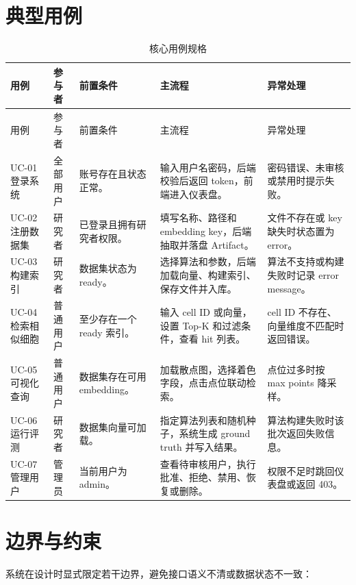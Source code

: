 \documentclass[UTF8,a4paper,12pt]{ctexrep}
\begin{document}
\section{典型用例}

\begin{longtable}{@{}L{0.10\textwidth}L{0.14\textwidth}L{0.20\textwidth}L{0.30\textwidth}L{0.14\textwidth}@{}}
  \caption{核心用例规格} \\
  \toprule
  用例 & 参与者 & 前置条件 & 主流程 & 异常处理 \\
  \midrule
  \endfirsthead
  \toprule
  用例 & 参与者 & 前置条件 & 主流程 & 异常处理 \\
  \midrule
  \endhead
  UC-01 登录系统 & 全部用户 & 账号存在且状态正常。 & 输入用户名密码，后端校验后返回 token，前端进入仪表盘。 & 密码错误、未审核或禁用时提示失败。 \\
  UC-02 注册数据集 & 研究者 & 已登录且拥有研究者权限。 & 填写名称、路径和 embedding key，后端抽取并落盘 Artifact。 & 文件不存在或 key 缺失时状态置为 error。 \\
  UC-03 构建索引 & 研究者 & 数据集状态为 ready。 & 选择算法和参数，后端加载向量、构建索引、保存文件并入库。 & 算法不支持或构建失败时记录 error message。 \\
  UC-04 检索相似细胞 & 普通用户 & 至少存在一个 ready 索引。 & 输入 cell ID 或向量，设置 Top-K 和过滤条件，查看 hit 列表。 & cell ID 不存在、向量维度不匹配时返回错误。 \\
  UC-05 可视化查询 & 普通用户 & 数据集存在可用 embedding。 & 加载散点图，选择着色字段，点击点位联动检索。 & 点位过多时按 max points 降采样。 \\
  UC-06 运行评测 & 研究者 & 数据集向量可加载。 & 指定算法列表和随机种子，系统生成 ground truth 并写入结果。 & 算法构建失败时该批次返回失败信息。 \\
  UC-07 管理用户 & 管理员 & 当前用户为 admin。 & 查看待审核用户，执行批准、拒绝、禁用、恢复或删除。 & 权限不足时跳回仪表盘或返回 403。 \\
  \bottomrule
\end{longtable}

\section{边界与约束}

系统在设计时显式限定若干边界，避免接口语义不清或数据状态不一致：
\end{document}
